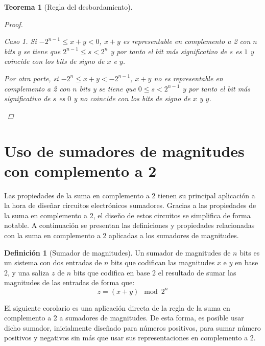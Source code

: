 \documentclass[spanish,a4paper,12pt,titlepage]{article}
\newtheorem{theorem}{Teorema}%
\theoremstyle{definition}
\newtheorem{definition}{Definición}%
\theoremstyle{remark}
\newtheorem{case}{Caso}
\begin{document}
\begin{theorem}[Regla del desbordamiento]
\begin{proof}
\begin{case}
            Si $-2^{n-1} \le x+y < 0$, $x+y$ es representable en complemento a 2 con $n$ bits y se tiene que $2^{n-1} \le s < 2^n$ y por tanto el bit más significativo de $s$ es $1$ y coincide con los bits de signo de $x$ e $y$.

            Por otra parte, si $-2^n \le x+y < -2^{n-1}$, $x+y$ no es representable en complemento a 2 con $n$ bits y se tiene que $0 \le s < 2^{n-1}$ y por tanto el bit más significativo de $s$ es $0$ y no coincide con los bits de signo de $x$ y $y$.
        \end{case}
    \end{proof}
\end{theorem}

\section{Uso de sumadores de magnitudes con complemento a 2}

Las propiedades de la suma en complemento a 2 tienen su principal aplicación a la hora de diseñar circuitos electrónicos sumadores. Gracias a las propiedades de la suma en complemento a 2, el diseño de estos circuitos se simplifica de forma notable. A continuación se presentan las definiciones y propiedades relacionadas con la suma en complemento a 2 aplicadas a los sumadores de magnitudes.

\begin{definition}[Sumador de magnitudes]
    Un sumador de magnitudes de $n$ bits es un sistema con dos entradas de $n$ bits que codifican las magnitudes $x$ e $y$ en base 2, y una saliza $z$ de $n$ bits que codifica en base 2 el resultado de sumar las magnitudes de las entradas de forma que:
    \[
        z = (x + y) \mod 2^n
    \]
\end{definition}

El siguiente corolario es una aplicación directa de la regla de la suma en complemento a 2 a sumadores de magnitudes. De esta forma, es posible usar dicho sumador, inicialmente diseñado para números positivos, para sumar número positivos y negativos sin más que usar sus representaciones en complemento a 2.
\end{document}
